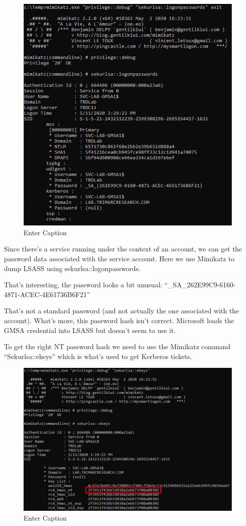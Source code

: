 \begin{figure}
    \centering
    \includegraphics[width=0.75\linewidth]{acct.png}
    \caption{Enter Caption}
    \label{fig:placeholder}
\end{figure}

Since there’s a service running under the context of an account, we can get the password data associated with the service account. Here we use Mimikatz to dump LSASS using sekurlsa::logonpasswords.

That’s interesting, the password looks a bit unusual: “\_SA\_{262E99C9-6160-4871-ACEC-4E61736B6F21}”

That’s not a standard password (and not actually the one associated with the account). What’s more, this password hash isn’t correct. Microsoft loads the GMSA credential into LSASS but doesn’t seem to use it.

To get the right NT password hash we need to use the Mimikatz command “Sekurlsa::ekeys” which is what’s used to get Kerberos tickets.

\begin{figure}
    \centering
    \includegraphics[width=0.75\linewidth]{mimi.png}
    \caption{Enter Caption}
    \label{fig:placeholder}
\end{figure}

